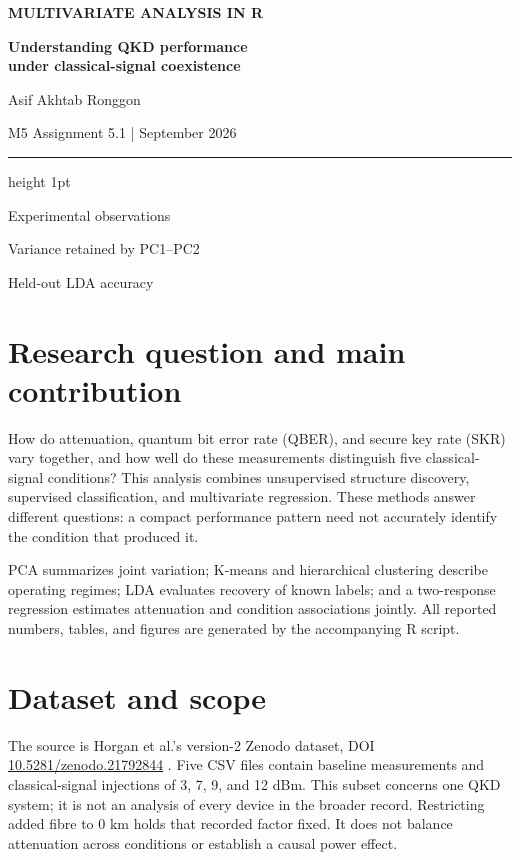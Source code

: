 \documentclass[11pt]{article}
\newcommand{\metric}[2]{\begin{minipage}[t]{0.29\linewidth}\centering\sffamily\color{teal}\LARGE\bfseries #1\par\vspace{3pt}\small\normalfont\color{ink}#2\end{minipage}}
\begin{document}
\thispagestyle{empty}
{\sffamily\small\color{teal}\bfseries MULTIVARIATE ANALYSIS IN R\par}
\vspace{8pt}
{\sffamily\huge\bfseries\color{navy}Understanding QKD performance\\[5pt]under classical-signal coexistence\par}
\vspace{9pt}
{\large Asif Akhtab Ronggon}\par
{\color{muted}M5 Assignment 5.1 \enspace | \enspace September 2026}
\vspace{10pt}
{\color{teal}\hrule height 1pt}
\vspace{15pt}
\noindent\metric{\NObs}{Experimental observations}\hfill
\metric{\PCTwoCum}{Variance retained by PC1--PC2}\hfill
\metric{\LDAAccuracy}{Held-out LDA accuracy}
\vspace{17pt}

\section*{Research question and main contribution}
How do attenuation, quantum bit error rate (QBER), and secure key rate (SKR) vary together, and how well do these measurements distinguish five classical-signal conditions? This analysis combines unsupervised structure discovery, supervised classification, and multivariate regression. These methods answer different questions: a compact performance pattern need not accurately identify the condition that produced it.

PCA summarizes joint variation; K-means and hierarchical clustering describe operating regimes; LDA evaluates recovery of known labels; and a two-response regression estimates attenuation and condition associations jointly. All reported numbers, tables, and figures are generated by the accompanying R script.

\section*{Dataset and scope}
The source is Horgan et al.'s version-2 Zenodo dataset, DOI \href{https://doi.org/10.5281/zenodo.21792844}{10.5281/zenodo.21792844} \cite{horgan}. Five CSV files contain baseline measurements and classical-signal injections of 3, 7, 9, and 12 dBm. This subset concerns one QKD system; it is not an analysis of every device in the broader record. Restricting added fibre to 0 km holds that recorded factor fixed. It does not balance attenuation across conditions or establish a causal power effect.
\end{document}
